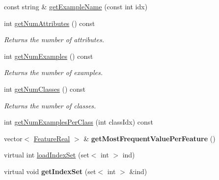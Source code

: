 \begin{DoxyCompactItemize}
\item 
const string \& \hyperlink{classMultiBoost_1_1InputData_a64d12c14b0f69c05b904bd809faabfb8}{get\-Example\-Name} (const int idx)
\item 
\hypertarget{classMultiBoost_1_1InputData_a96ab72ee9f4f3713786794cb4ae0b926}{int \hyperlink{classMultiBoost_1_1InputData_a96ab72ee9f4f3713786794cb4ae0b926}{get\-Num\-Attributes} () const }\label{classMultiBoost_1_1InputData_a96ab72ee9f4f3713786794cb4ae0b926}

\begin{DoxyCompactList}\small\item\em Returns the number of attributes. \end{DoxyCompactList}\item 
\hypertarget{classMultiBoost_1_1InputData_a6bbe9949016d04c361640c3624f9a32a}{int \hyperlink{classMultiBoost_1_1InputData_a6bbe9949016d04c361640c3624f9a32a}{get\-Num\-Examples} () const }\label{classMultiBoost_1_1InputData_a6bbe9949016d04c361640c3624f9a32a}

\begin{DoxyCompactList}\small\item\em Returns the number of examples. \end{DoxyCompactList}\item 
\hypertarget{classMultiBoost_1_1InputData_a389983328bd80477caa3885ed9830ff8}{int \hyperlink{classMultiBoost_1_1InputData_a389983328bd80477caa3885ed9830ff8}{get\-Num\-Classes} () const }\label{classMultiBoost_1_1InputData_a389983328bd80477caa3885ed9830ff8}

\begin{DoxyCompactList}\small\item\em Returns the number of classes. \end{DoxyCompactList}\item 
int \hyperlink{classMultiBoost_1_1InputData_adeeb05a894b4d7bf769d3d5c346006a7}{get\-Num\-Examples\-Per\-Class} (int class\-Idx) const 
\item 
\hypertarget{classMultiBoost_1_1InputData_a220bc98fc4f4935e71eef90d7f529655}{vector$<$ \hyperlink{Defaults_8h_a3a11cfe6a5d469d921716ca6291e934f}{Feature\-Real} $>$ \& {\bfseries get\-Most\-Frequent\-Value\-Per\-Feature} ()}\label{classMultiBoost_1_1InputData_a220bc98fc4f4935e71eef90d7f529655}

\item 
virtual int \hyperlink{classMultiBoost_1_1InputData_a00150efbaf1e3e994786ec1fb9283119}{load\-Index\-Set} (set$<$ int $>$ ind)
\item 
\hypertarget{classMultiBoost_1_1InputData_a9009df0e64b117bba2c1678039308279}{virtual void {\bfseries get\-Index\-Set} (set$<$ int $>$ \&ind)}\label{classMultiBoost_1_1InputData_a9009df0e64b117bba2c1678039308279}


\end{DoxyCompactItemize}
